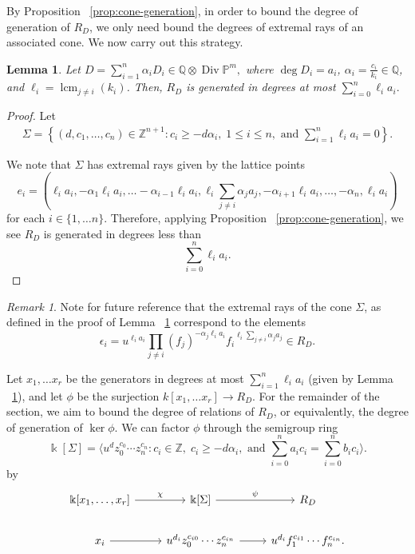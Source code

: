 \documentclass{amsart}
\theoremstyle{plain}
\newtheorem{lem}[thm]{Lemma}
\theoremstyle{definition}
\theoremstyle{remark}
\newtheorem{rem}[thm]{Remark}
\numberwithin{equation}{section}
\newcommand\bq{{\mathbb Q}}
\newcommand\bp{{\mathbb P}}
\newcommand\bz{{\mathbb Z}}
\newcommand\bk{{\Bbbk}}
\DeclareMathOperator\di{Div}
\newcommand\bida{a}
\newcommand\bidb{b}
\DeclareMathOperator{\lcm}{lcm}
\begin{document}
By Proposition ~\ref{prop:cone-generation}, in order to bound
the degree of generation of $R_D$, we only need bound
the degrees of extremal rays of an associated cone. We now carry out
this strategy.

\begin{lem} \label{lem:proj-generators}
Let $D = \sum_{i=1}^{n} \alpha_i D_i \in \bq \otimes \di \bp^m,$ where
$\deg D_i = \bida_i$, $\alpha_i = \frac{c_i}{k_i}\in \bq$, and
$\ell_i = \lcm_{j \neq i} (k_i)$. Then, $R_D$ is generated in degrees at most $\sum_{i=0}^n \ell_i \bida_i.$

\end{lem}
\begin{proof}
Let 
\begin{align}\label{eqn:Sigma-def}
	\Sigma = \left \{(d, c_1, \ldots, c_n) \in \bz^{n+1} : c_i \geq - d
\alpha_i, \; 1 \leq i \leq n, \text{ and } \sum_{i=1}^{n} \ell_i \bida_i = 0
\right \}.
\end{align}

We note that $\Sigma$ has extremal rays given by the lattice points 
\begin{equation}\label{defn:e-i-proj}
	e_i = \left(\ell_i \bida_i, - \alpha_1 \ell_i \bida_i, \ldots
-\alpha_{i-1} \ell_i \bida_i, \ell_i \sum_{j\ne i} \alpha_j \bida_j,
-\alpha_{i+1} \ell_i \bida_i, \ldots, -\alpha_n, \ell_i \bida_i \right)
\end{equation}
for each $i\in \{1, \ldots n\}$.
Therefore, applying Proposition ~\ref{prop:cone-generation}, we see $R_D$ is generated in degrees less than
\[
	\sum_{i=0}^n \ell_i \bida_i.
\]
\end{proof}

\begin{rem}
\label{rem:pm-extremal-rays}
Note for future reference that the extremal rays of the cone $\Sigma$, as
defined in the proof of Lemma ~\ref{lem:proj-generators} correspond to the
elements
\begin{equation}
\label{eqn:epsilon-def-proj}
	\epsilon_i = u^{\ell_i a_i}\prod_{j\ne i} (f_j)^{-\alpha_j \ell_i a_i} {f_i}^{\ell_i \sum_{j\ne i} \alpha_j a_j}\in R_D.
\end{equation}
\end{rem}

Let $x_1, \ldots x_r$ be the generators in degrees at most $\sum_{i=1}^n \ell_i
\bida_i$ (given by Lemma ~\ref{lem:proj-generators}), and let $\phi$ be the
surjection $k[x_1, \ldots x_r] \to R_D$.
For the remainder of the section, we aim to bound the degree of relations
of $R_D$, or equivalently, the degree of generation of $\ker \phi$.
  We can factor $\phi$ through the
semigroup ring 
\[
	\bk[\Sigma] =  \langle u^d z_0^{c_0} \cdots z_n^{c_n} : c_i \in
\bz, \; c_i \geq -d \alpha_i, \mbox{ and }\sum_{i=0}^{n} \bida_i c_i =
\sum_{i=0}^{n} \bidb_i c_i \rangle. 
\]
by
\[
\begin{tikzcd}
\bk[x_1,\ldots, x_r] \ar {r}{\chi} & \bk[\Sigma] \ar {r}{\psi} & R_D \\
x_i \ar r & u^{d_i}z_0^{c_{i0}} \cdots z_n^{c_{in}} \ar r & u^{d_i}f_1^{c_{i1}} \cdots f_n^{c_{in}}.
\end{tikzcd}
\]
\end{document}
